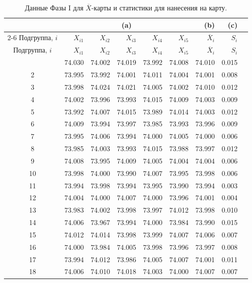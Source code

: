 {\small
\begin{longtable}{crrrrrrrr}
	\caption{Данные Фазы I для \(\overline{X}\)-карты и статистики для нанесения на карту.}
	\label{tab:3.24} \\
	\toprule
	& \multicolumn{5}{c}{(a)} & (b) & (c) \\
	\cmidrule(lr){2-6}
	Подгруппа, \(i\) & \(X_{i1}\) & \(X_{i2}\) & \(X_{i3}\) & \(X_{i4}\) & \(X_{i5}\) & \(\overline{X}_i\) & \(S_i\) \\
	\midrule
	\endfirsthead
	\toprule
	Подгруппа, \(i\) & \(X_{i1}\) & \(X_{i2}\) & \(X_{i3}\) & \(X_{i4}\) & \(X_{i5}\) & \(\overline{X}_i\) & \(S_i\) \\
	\midrule
	\endhead
	\bottomrule
	\endfoot
	1  & 74.030 & 74.002 & 74.019 & 73.992 & 74.008 & 74.010 & 0.015 \\
	2  & 73.995 & 73.992 & 74.001 & 74.011 & 74.004 & 74.001 & 0.008 \\
	3  & 73.998 & 74.024 & 74.021 & 74.005 & 74.002 & 74.010 & 0.012 \\
	4  & 74.002 & 73.996 & 73.993 & 74.015 & 74.009 & 74.003 & 0.009 \\
	5  & 73.992 & 74.007 & 74.015 & 73.989 & 74.014 & 74.003 & 0.012 \\
	6  & 74.009 & 73.994 & 73.997 & 73.985 & 73.993 & 73.996 & 0.009 \\
	7  & 73.995 & 74.006 & 73.994 & 74.000 & 74.005 & 74.000 & 0.006 \\
	8  & 73.985 & 74.003 & 73.993 & 74.015 & 73.988 & 73.997 & 0.012 \\
	9  & 74.008 & 73.995 & 74.009 & 74.005 & 74.004 & 74.004 & 0.006 \\
	10 & 73.998 & 74.000 & 73.990 & 74.007 & 73.995 & 73.998 & 0.006 \\
	11 & 73.994 & 73.998 & 73.994 & 73.995 & 73.990 & 73.994 & 0.003 \\
	12 & 74.004 & 74.000 & 74.007 & 74.000 & 73.996 & 74.001 & 0.004 \\
	13 & 73.983 & 74.002 & 73.998 & 73.997 & 74.012 & 73.998 & 0.010 \\
	14 & 74.006 & 73.967 & 73.994 & 74.000 & 73.984 & 73.990 & 0.015 \\
	15 & 74.012 & 74.014 & 73.998 & 73.999 & 74.007 & 74.006 & 0.007 \\
	16 & 74.000 & 73.984 & 74.005 & 73.998 & 73.996 & 73.997 & 0.008 \\
	17 & 73.994 & 74.012 & 73.986 & 74.005 & 74.007 & 74.001 & 0.011 \\
	18 & 74.006 & 74.010 & 74.018 & 74.003 & 74.000 & 74.007 & 0.007 \\

\end{longtable}}

